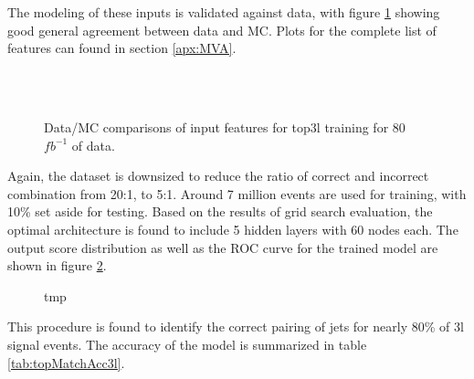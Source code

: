 The modeling of these inputs is validated against data, with figure \ref{fig:model_top3l} showing good general agreement between data and MC. Plots for the complete list of features can found in section \ref{apx:MVA}.

\begin{figure}[h!]                                                                                                         
    \\
    \\
    \caption{Data/MC comparisons of input features for top3l training for 80 $fb^{-1}$ of data.}
    \label{fig:model_top3l}
\end{figure}

Again, the dataset is downsized to reduce the ratio of correct and incorrect combination from 20:1, to 5:1. Around 7 million events are used for training, with 10\% set aside for testing. Based on the results of grid search evaluation, the optimal architecture is found to include 5 hidden layers with 60 nodes each. The output score distribution as well as the ROC curve for the trained model are shown in figure \ref{fig:top3lresults}.

\begin{figure}[h!]                                                                                                           
   \label{fig:top3lresults}                                                                                               
   \caption{tmp}
\end{figure}

This procedure is found to identify the correct pairing of jets for nearly 80\% of 3l signal events. The accuracy of the model is summarized in table \ref{tab:topMatchAcc3l}.

